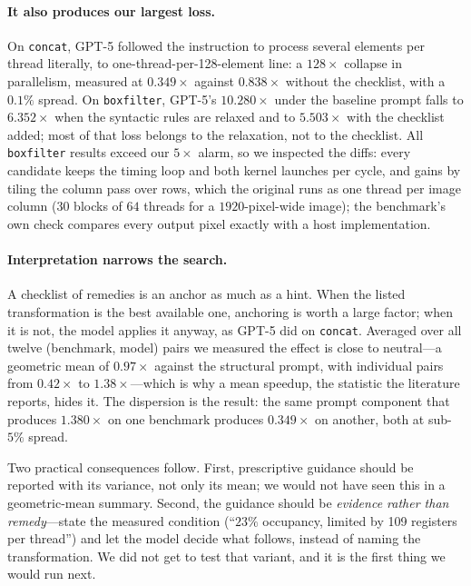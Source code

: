\paragraph{It also produces our largest loss.}
On \texttt{concat}, GPT-5 followed the instruction to process several elements per thread literally,
to one-thread-per-128-element line: a $128\times$ collapse in parallelism, measured at $0.349\times$
against $0.838\times$ without the checklist, with a $0.1\%$ spread. On \texttt{boxfilter}, GPT-5's
$10.280\times$ under the baseline prompt falls to $6.352\times$ when the syntactic rules are relaxed and
to $5.503\times$ with the checklist added; most of that loss belongs to the relaxation, not to the
checklist. All \texttt{boxfilter} results exceed our $5\times$ alarm, so we inspected the diffs: every
candidate keeps the timing loop and both kernel launches per cycle, and gains by tiling the column
pass over rows, which the original runs as one thread per image column ($30$ blocks of $64$ threads
for a $1920$-pixel-wide image); the benchmark's own check compares every output pixel exactly with a
host implementation.

\paragraph{Interpretation narrows the search.}
A checklist of remedies is an anchor as much as a hint. When the listed transformation is the best
available one, anchoring is worth a large factor; when it is not, the model applies it anyway, as
GPT-5 did on \texttt{concat}. Averaged over all twelve (benchmark, model) pairs we measured the effect
is close to neutral---a geometric mean of $0.97\times$ against the structural prompt, with
individual pairs from $0.42\times$ to $1.38\times$---which is why a mean speedup, the statistic the
literature reports, hides it. The dispersion is the result: the same prompt component that produces
$1.380\times$ on one benchmark produces $0.349\times$ on another, both at sub-$5\%$ spread.

Two practical consequences follow. First, prescriptive guidance should be reported with its variance,
not only its mean; we would not have seen this in a geometric-mean summary. Second, the guidance should
be \emph{evidence rather than remedy}---state the measured condition (``$23\%$ occupancy, limited by
109 registers per thread'') and let the model decide what follows, instead of naming the
transformation. We did not get to test that variant, and it is the first thing we would run next.

